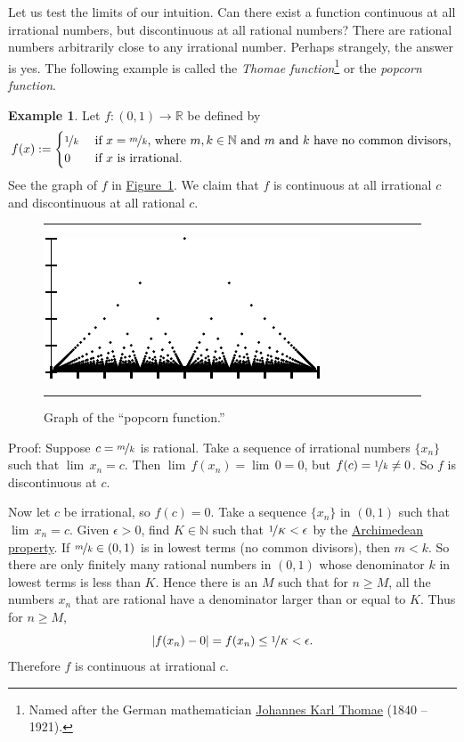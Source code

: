 \documentclass[12pt]{book}
\newenvironment{myfigureht}{%
\begin{figure}[h!t]
\noindent\rule{\textwidth}{0.4pt}\vspace{12pt}\par\centering}%
{\par\noindent\rule{\textwidth}{0.4pt}
\end{figure}}
\newcommand{\abs}[1]{\left\lvert {#1} \right\rvert}
\newcommand{\R}{{\mathbb{R}}}
\newcommand{\N}{{\mathbb{N}}}
\newcommand{\myindex}[1]{#1\index{#1}}
\theoremstyle{plain}
\theoremstyle{remark}
\theoremstyle{definition}
\theoremstyle{exercise}
\theoremstyle{example}
\newtheorem{example}[thm]{Example}
\newcommand{\figureref}[1]{\hyperref[#1]{Figure~\ref*{#1}}}
\begin{document}
Let us test the limits of our intuition.  Can
there exist a function continuous at all irrational numbers, but
discontinuous at all rational numbers?  There are rational numbers
arbitrarily close to any irrational number.  Perhaps strangely, the
answer is yes.  The following example is called the
\emph{\myindex{Thomae function}}\footnote{Named after the German
mathematician
\href{http://en.wikipedia.org/wiki/Thomae}{Johannes Karl Thomae}
(1840 -- 1921).} or the
\emph{\myindex{popcorn function}}.

\begin{example} \label{popcornfunction:example}
Let $f \colon (0,1) \to \R$ be defined by
\begin{equation*}
f(x) := 
\begin{cases}
\nicefrac{1}{k} & \text{ if $x=\nicefrac{m}{k}$, where $m,k \in \N$
and $m$ and $k$ have no common divisors,} \\
0 & \text{ if $x$ is irrational}.
\end{cases}
\end{equation*}
See the graph of $f$
in \figureref{popcornfig}.
We claim that
$f$ is continuous at all irrational $c$ and 
discontinuous at all rational $c$.
\begin{myfigureht}
\includegraphics{figures/popcornfig}
\caption{Graph of the ``popcorn function.''\label{popcornfig}}
\end{myfigureht}

Proof:
Suppose $c = \nicefrac{m}{k}$ is rational.  Take a sequence of
irrational numbers $\{ x_n \}$ such that $\lim\, x_n = c$.  Then
$\lim\, f(x_n) = \lim \, 0 = 0$, but $f(c) = \nicefrac{1}{k} \not= 0$.  So $f$
is discontinuous at $c$.

Now let $c$ be irrational, so $f(c) = 0$.  Take a sequence 
$\{ x_n \}$ in $(0,1)$ such that $\lim\, x_n = c$.
Given $\epsilon > 0$, find $K \in \N$ such
that $\nicefrac{1}{K} < \epsilon$
by the \hyperref[thm:arch:i]{Archimedean property}.
If $\nicefrac{m}{k} \in (0,1)$ is in lowest terms
(no common divisors), then $m < k$.
So there are only finitely many rational numbers in $(0,1)$
whose denominator $k$ in lowest terms is less than $K$.  Hence
there is an $M$ such that for $n \geq M$, all the numbers $x_n$
that are rational
have a denominator larger than or equal to $K$.  Thus for $n \geq M$,
\begin{equation*}
\abs{f(x_n) - 0} = f(x_n) \leq \nicefrac{1}{K} < \epsilon .
\end{equation*}
Therefore $f$ is continuous at irrational $c$.
\end{example}
\end{document}
